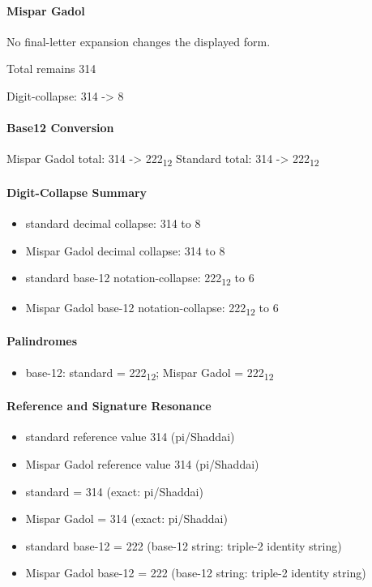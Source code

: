 \paragraph{Mispar Gadol}
No final-letter expansion changes the displayed form.

Total remains 314

Digit-collapse: 314 -> 8
\paragraph{Base12 Conversion}
Mispar Gadol total: 314 -> 222\textsubscript{12}
Standard total: 314 -> 222\textsubscript{12}
\paragraph{Digit-Collapse Summary}
\begin{itemize}
\item standard decimal collapse: 314 to 8
\item Mispar Gadol decimal collapse: 314 to 8
\item standard base-12 notation-collapse: 222\textsubscript{12} to 6
\item Mispar Gadol base-12 notation-collapse: 222\textsubscript{12} to 6
\end{itemize}
\paragraph{Palindromes}
\begin{itemize}
\item base-12: standard = 222\textsubscript{12}; Mispar Gadol = 222\textsubscript{12}
\end{itemize}
\paragraph{Reference and Signature Resonance}
\begin{itemize}
\item standard reference value 314 (pi/Shaddai)
\item Mispar Gadol reference value 314 (pi/Shaddai)
\item standard = 314 (exact: pi/Shaddai)
\item Mispar Gadol = 314 (exact: pi/Shaddai)
\item standard base-12 = 222 (base-12 string: triple-2 identity string)
\item Mispar Gadol base-12 = 222 (base-12 string: triple-2 identity string)
\end{itemize}
